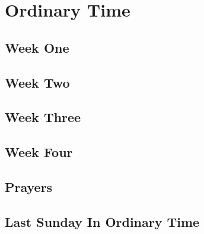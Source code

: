\documentclass[extrafontsizes,12pt,twoside]{memoir}
\begin{document}
\chapter*[Ordinary Time]{Ordinary Time}
\clearpage

\section*{Week One}

\section*{Week Two}

\section*{Week Three}

\section*{Week Four}

\section*{Prayers}
\section*{Last Sunday In Ordinary Time}

\end{document}
